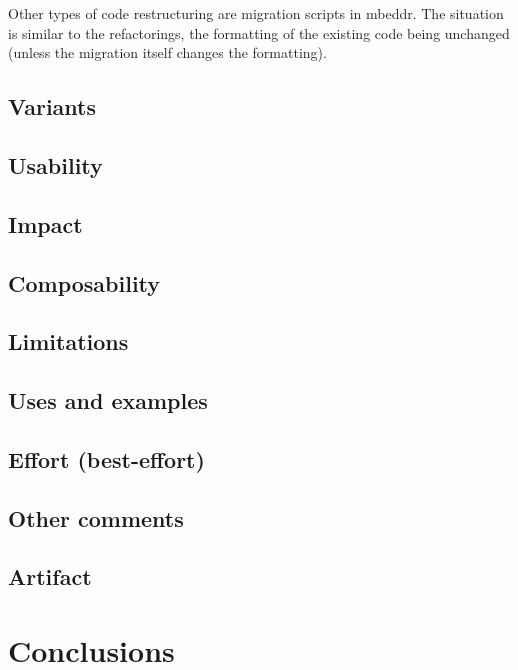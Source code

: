 \documentclass[preprint,numbers,10pt]{sigplanconf}
\begin{document}
Other types of code restructuring are migration scripts in mbeddr. The situation is similar to the refactorings, the
formatting of the existing code being unchanged (unless the migration itself changes the formatting).
\subsection{Variants}

\subsection{Usability}

\subsection{Impact}

\subsection{Composability}

\subsection{Limitations}

\subsection{Uses and examples}

\subsection{Effort (best-effort)}

\subsection{Other comments}

\subsection{Artifact}

%
%

\section{Conclusions}
\end{document}

